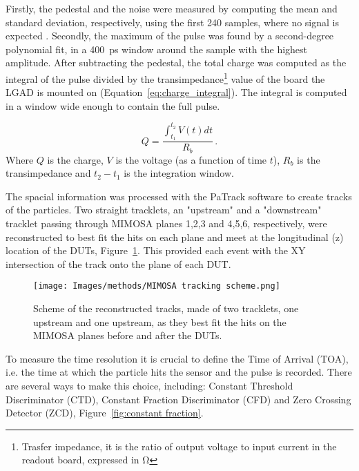 Firstly, the pedestal and the noise were measured by computing the mean and standard deviation, respectively, using the first 240 samples, where no signal is expected \cite{Allaire:2018bof}. Secondly, the maximum of the pulse was found by a second-degree polynomial fit, in a \qty{400}{\pico\second} window around the sample with the highest amplitude. After subtracting the pedestal, the total charge was computed as the integral of the pulse divided by the transimpedance\footnote{Trasfer impedance, it is the ratio of output voltage to input current in the readout board, expressed in \unit{\ohm}} value of the board the LGAD is mounted on (Equation~\ref{eq:charge_integral}). The integral is computed in a window wide enough to contain the full pulse.

\begin{equation}\label{eq:charge_integral}
    Q = \frac{\int_{t_1}^{t_2} V(t)dt}{R_b} \, .
\end{equation}
Where \(Q\) is the charge, \(V\) is the voltage (as a function of time \(t\)), \(R_b\) is the transimpedance and \(t_2-t_1\) is the integration window.

The spacial information was processed with the PaTrack software to create tracks of the particles. Two straight tracklets, an "upstream" and a "downstream" tracklet passing through MIMOSA planes 1,2,3 and 4,5,6, respectively, were reconstructed to best fit the hits on each plane and meet at the longitudinal (z) location of the DUTs, Figure~\ref{fig:mimosa_tracking}. This provided each event with the XY intersection of the track onto the plane of each DUT. 

\begin{figure}[h!btp]
    \centering
    \texttt{[image: Images/methods/MIMOSA tracking scheme.png]}
    \captionsetup{width=\captionwidth}
    \caption{Scheme of the reconstructed tracks, made of two tracklets, one upstream and one upstream, as they best fit the hits on the MIMOSA planes before and after the DUTs.}
    \label{fig:mimosa_tracking}
\end{figure} 


To measure the time resolution it is crucial to define the Time of Arrival (TOA), i.e. the time at which the particle hits the sensor and the pulse is recorded. There are several ways to make this choice, including: Constant Threshold Discriminator (CTD), Constant Fraction Discriminator (CFD) and Zero Crossing Detector (ZCD), Figure~\ref{fig:constant fraction}.

